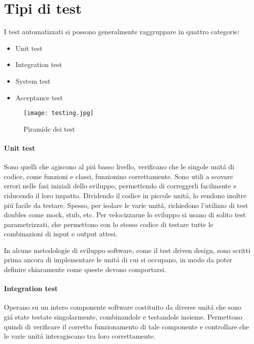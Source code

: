 \documentclass[italian, oneside]{sapthesis} %
\begin{document}
	\section{Tipi di test}
		I test automatizzati si possono generalmente raggruppare in quattro categorie:
		\begin{itemize}
			\item Unit test
			\item Integration test
			\item System test
			\item Acceptance test
		\end{itemize}

		\begin{figure}[h]
			\begin{center}
			\texttt{[image: testing.jpg]}
			\captionsetup{justification=centering}
			\caption{Piramide dei test}
			\label{fig:8}
		\end{center}
		\end{figure}

		\paragraph*{Unit test} Sono quelli che agiscono al pi\'u basso livello, verificano che le singole unit\'a di codice, come funzioni e classi, funzionino correttamente. Sono utili a scovare errori nelle fasi iniziali dello sviluppo, permettendo di correggerli facilmente e riducendo il loro impatto. Dividendo il codice in piccole unit\'a, lo rendono inoltre pi\'u facile da testare. Spesso, per isolare le varie unit\'a, richiedono l'utilizzo di test doubles come mock, stub, etc. Per velocizzarne lo sviluppo si usano di solito test parametrizzati, che permettono con lo stesso codice di testare tutte le combinazioni di input e output attesi.

		In alcune metodologie di sviluppo software, come il test driven design, sono scritti prima ancora di implementare le unit\'a di cui si occupano, in modo da poter definire chiaramente come queste devono comportarsi.

		\paragraph*{Integration test} Operano su un intero componente software costituito da diverse unit\'a che sono gi\'a state testate singolarmente, combinandole e testandole insieme. Permettono quindi di verificare il corretto funzionamento di tale componente e controllare che le varie unit\'a interagiscano tra loro correttamente.
\end{document}
